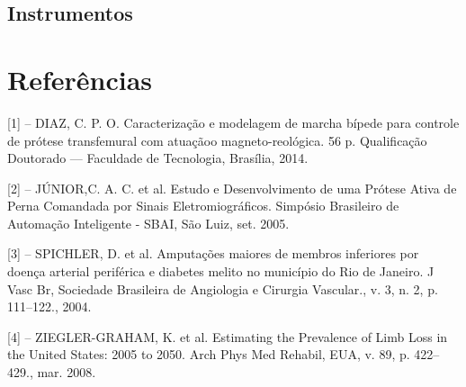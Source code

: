\subsection{Instrumentos}

\section{Referências}
\begin{frame}
\footnotesize
{[1] -- DIAZ, C. P. O. Caracterização e modelagem de marcha bípede para controle de prótese
transfemural com atuaçãoo magneto-reológica. 56 p. Qualificação Doutorado — Faculdade de Tecnologia, Brasília, 2014.

[2] -- JÚNIOR,C. A. C. et al. Estudo e Desenvolvimento de uma Prótese Ativa de Perna Comandada por Sinais Eletromiográficos. 
Simpósio Brasileiro de Automação Inteligente - SBAI, São Luiz, set. 2005.
 
[3] -- SPICHLER, D. et al. Amputações maiores de membros inferiores por doença arterial
periférica e diabetes melito no município do Rio de Janeiro. J Vasc Br, Sociedade
Brasileira de Angiologia e Cirurgia Vascular., v. 3, n. 2, p. 111–122., 2004. 
 
[4] -- ZIEGLER-GRAHAM, K. et al. Estimating the Prevalence of Limb Loss in the United
States: 2005 to 2050. Arch Phys Med Rehabil, EUA, v. 89, p. 422–429., mar. 2008.
}
 
\end{frame}


















